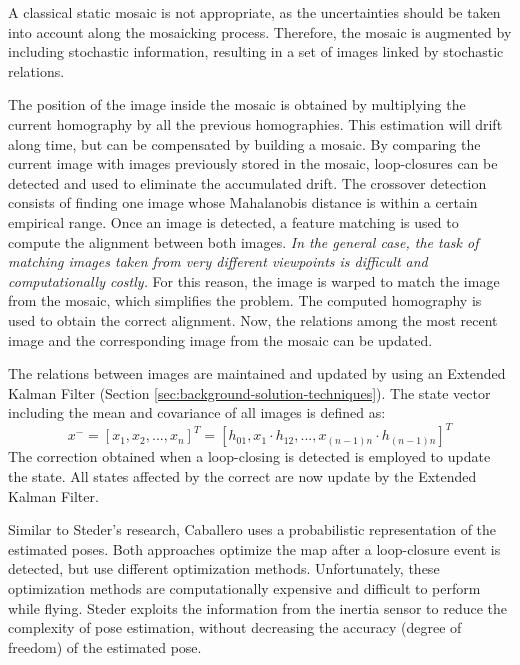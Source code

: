 A classical static mosaic is not appropriate, as the uncertainties should be taken into account along the mosaicking process.
Therefore, the mosaic is augmented by including stochastic information, resulting in a set of images linked by stochastic relations.

The position of the image inside the mosaic is obtained by multiplying the current homography by all the previous homographies.
This estimation will drift along time, but can be compensated by building a mosaic.
By comparing the current image with images previously stored in the mosaic, loop-closures can be detected and used to eliminate the accumulated drift.
The crossover detection consists of finding one image whose Mahalanobis distance is within a certain empirical range.
Once an image is detected, a feature matching is used to compute the alignment between both images. 
\textit{In the general case, the task of matching images taken from very different viewpoints is difficult and computationally costly.}
For this reason, the image is warped to match the image from the mosaic, which simplifies the problem.
The computed homography is used to obtain the correct alignment.
Now, the relations among the most recent image and the corresponding image from the mosaic can be updated.

The relations between images are maintained and updated by using an Extended Kalman Filter (Section \ref{sec:background-solution-techniques}).
The state vector including the mean and covariance of all images is defined as:
\begin{equation}
x^{-} = [x_1, x_2, ..., x_n]^T = [h_{01}, x_1 \cdot h_{12}, ..., x_{(n-1)n} \cdot h_{(n-1)n}]^T
\end{equation}
The correction obtained when a loop-closing is detected is employed to update the state.
All states affected by the correct are now update by the Extended Kalman Filter.

Similar to Steder's research, Caballero uses a probabilistic representation of the estimated poses.
Both approaches optimize the map after a loop-closure event is detected, but use different optimization methods.
Unfortunately, these optimization methods are computationally expensive and difficult to perform while flying.
Steder exploits the information from the inertia sensor to reduce the complexity of pose estimation, without decreasing the accuracy (degree of freedom) of the estimated pose.



